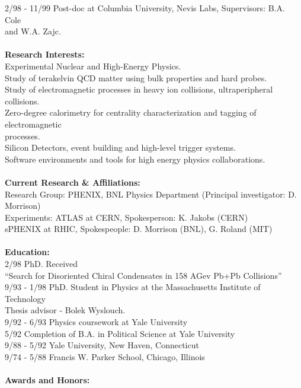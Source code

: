 \documentclass[11 pt]{article}
\begin{document}
\begin{tabbing}
2/98 - 11/99 \>Post-doc at Columbia University, Nevis Labs, Supervisors: B.A. Cole\\ \> and W.A. Zajc.\\
\\
{\bf Research Interests:}\\
\> Experimental Nuclear and High-Energy Physics.\\
\> Study of terakelvin QCD matter using bulk properties and hard probes.\\
\> Study of electromagnetic processes in heavy ion collisions, ultraperipheral collisions.\\
\> Zero-degree calorimetry for centrality characterization and tagging of electromagnetic\\ \> processes.\\
\> Silicon Detectors, event building and high-level trigger systems.\\  
\> Software environments and tools for high energy physics collaborations.\\
\\
\textbf{Current Research \& Affiliations:}\\
Research Group: \> PHENIX, BNL Physics Department (Principal investigator: D. Morrison) \\
Experiments: 
\> ATLAS at CERN, Spokesperson: K. Jakobs (CERN) \\
\> sPHENIX at RHIC, Spokespeople: D. Morrison (BNL), G. Roland (MIT)\\
\\
\textbf{Education:}\\
2/98 \> PhD. Received\\
\> ``Search for Disoriented Chiral Condensates in 158
AGev Pb+Pb Collisions''\\
9/93 - 1/98 \> PhD. Student in Physics at the Massachusetts Institute
of Technology\\
\>Thesis advisor - Bolek Wyslouch.\\
9/92 - 6/93 \> Physics coursework at Yale University \\
5/92 \> Completion of B.A. in Political Science at Yale University \\
9/88 - 5/92 \> Yale University, New Haven, Connecticut \\
9/74 - 5/88 \> Francis W. Parker School, Chicago, Illinois \\
\\
\textbf{Awards and Honors:}\\

\end{tabbing}
\end{document}
